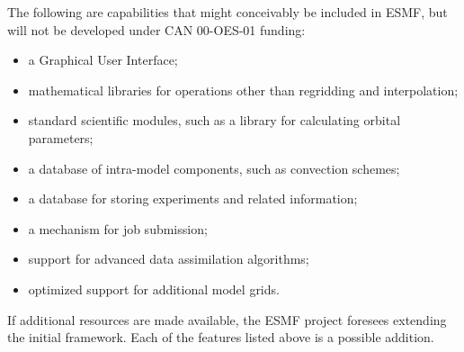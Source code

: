 The following are capabilities that might conceivably be included in ESMF, but will not be 
developed under CAN 00-OES-01 funding:
\begin{itemize}
\item a Graphical User Interface;
\item mathematical libraries for operations other than regridding and interpolation;
\item standard scientific modules, such as a library for calculating orbital parameters;
\item a database of intra-model components, such as convection schemes;
\item a database for storing experiments and related information;
\item a mechanism for job submission;
\item support for advanced data assimilation algorithms;
\item optimized support for additional model grids.
\end{itemize}

If additional resources are made available, the ESMF project foresees extending the 
initial framework.  Each of the features listed above is a possible addition. 




















